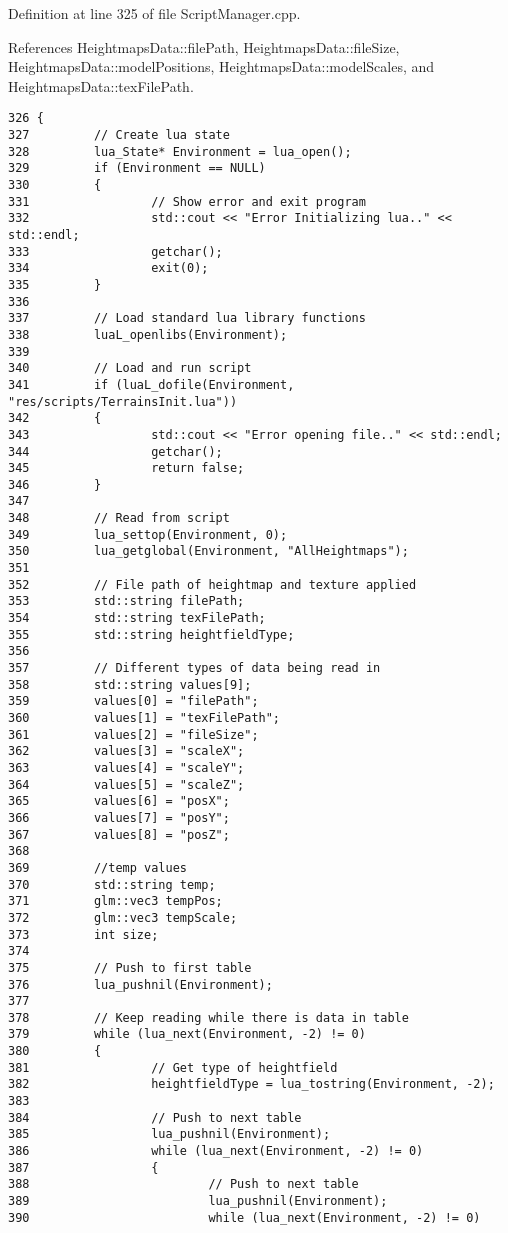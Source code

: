 Definition at line 325 of file ScriptManager.cpp.

References HeightmapsData::filePath, HeightmapsData::fileSize, HeightmapsData::modelPositions, HeightmapsData::modelScales, and HeightmapsData::texFilePath.

\begin{Code}\begin{verbatim}326 {
327         // Create lua state
328         lua_State* Environment = lua_open();
329         if (Environment == NULL)
330         {
331                 // Show error and exit program
332                 std::cout << "Error Initializing lua.." << std::endl;
333                 getchar();
334                 exit(0);
335         }
336 
337         // Load standard lua library functions
338         luaL_openlibs(Environment);
339 
340         // Load and run script
341         if (luaL_dofile(Environment, "res/scripts/TerrainsInit.lua"))
342         {
343                 std::cout << "Error opening file.." << std::endl;
344                 getchar();
345                 return false;
346         }
347 
348         // Read from script
349         lua_settop(Environment, 0);
350         lua_getglobal(Environment, "AllHeightmaps");
351 
352         // File path of heightmap and texture applied
353         std::string filePath;
354         std::string texFilePath;
355         std::string heightfieldType;
356 
357         // Different types of data being read in
358         std::string values[9];
359         values[0] = "filePath";
360         values[1] = "texFilePath";
361         values[2] = "fileSize";
362         values[3] = "scaleX";
363         values[4] = "scaleY";
364         values[5] = "scaleZ";
365         values[6] = "posX";
366         values[7] = "posY";
367         values[8] = "posZ";
368 
369         //temp values
370         std::string temp;
371         glm::vec3 tempPos;
372         glm::vec3 tempScale;
373         int size;
374 
375         // Push to first table
376         lua_pushnil(Environment);
377 
378         // Keep reading while there is data in table
379         while (lua_next(Environment, -2) != 0)
380         {
381                 // Get type of heightfield
382                 heightfieldType = lua_tostring(Environment, -2);
383 
384                 // Push to next table
385                 lua_pushnil(Environment);
386                 while (lua_next(Environment, -2) != 0)
387                 {
388                         // Push to next table
389                         lua_pushnil(Environment);
390                         while (lua_next(Environment, -2) != 0)

\end{verbatim}
\end{Code}
